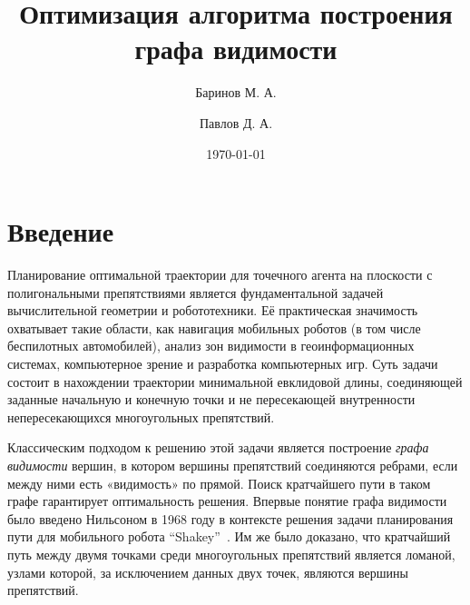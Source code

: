 \documentclass{article}
\theoremstyle{definition}
\begin{document}
\title{Оптимизация алгоритма построения графа видимости}
\date{\today}


\author[1]{Баринов М. А.}
\author[2]{Павлов Д. А.}

\maketitle

\begin{abstract}
  \end{abstract}

\section{Введение}

Планирование оптимальной траектории для точечного агента на плоскости с полигональными препятствиями
является фундаментальной задачей вычислительной геометрии и робототехники.
Её практическая значимость охватывает такие области, как навигация мобильных роботов (в том числе беспилотных автомобилей),
анализ зон видимости в геоинформационных системах, компьютерное зрение и разработка компьютерных игр.
Суть задачи состоит в нахождении траектории минимальной евклидовой длины, соединяющей заданные начальную
и конечную точки и не пересекающей внутренности непересекающихся многоугольных препятствий.

Классическим подходом к решению этой задачи является построение \textit{графа видимости} вершин,
в котором вершины препятствий соединяются ребрами, если между ними есть «видимость» по прямой.
Поиск кратчайшего пути в таком графе гарантирует оптимальность решения.
Впервые понятие графа видимости было введено Нильсоном в 1968 году в контексте 
решения задачи планирования пути для мобильного робота ``Shakey''~\cite{nilsson69}.
Им же было доказано, что кратчайший путь между двумя точками среди многоугольных 
препятствий является ломаной, узлами которой, за исключением данных двух точек,
являются вершины препятствий.
\end{document}
